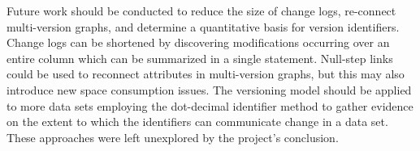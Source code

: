 Future work should be conducted to reduce the size of change logs, re-connect multi-version graphs, and determine a quantitative basis for version identifiers.
Change logs can be shortened by discovering modifications occurring over an entire column which can be summarized in a single statement.
Null-step links could be used to reconnect attributes in multi-version graphs, but this may also introduce new space consumption issues.
The versioning model should be applied to more data sets employing the dot-decimal identifier method to gather evidence on the extent to which the identifiers can communicate change in a data set.
These approaches were left unexplored by the project's conclusion.
